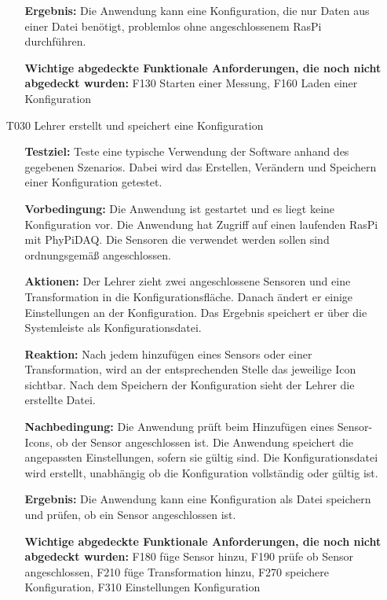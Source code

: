 \documentclass[parskip=full]{scrartcl}
\begin{document}
\begin{itemize}
\begin{itemize}
\item []\textbf{Ergebnis:} Die Anwendung kann eine Konfiguration, die nur Daten aus einer Datei benötigt, problemlos ohne angeschlossenem \gls{RasPi} durchführen. 
\item []\textbf{Wichtige abgedeckte Funktionale Anforderungen, die noch nicht abgedeckt wurden:} F130 Starten einer Messung, F160 Laden einer Konfiguration

\end{itemize}



\item[T030] Lehrer erstellt und speichert eine Konfiguration
\begin{itemize}

\item []\textbf{Testziel:} Teste eine typische Verwendung der Software anhand des gegebenen Szenarios. Dabei wird das Erstellen, Verändern und Speichern einer Konfiguration getestet.

\item []\textbf{Vorbedingung:} Die Anwendung ist gestartet und es liegt keine Konfiguration vor. Die Anwendung hat Zugriff auf einen laufenden \gls{RasPi} mit \gls{PhyPiDAQ}. Die Sensoren die verwendet werden sollen sind ordnungsgemäß angeschlossen.
\item []\textbf{Aktionen:} Der Lehrer zieht zwei angeschlossene Sensoren und eine Transformation in die Konfigurationsfläche. Danach ändert er einige Einstellungen an der Konfiguration. Das Ergebnis speichert er über die Systemleiste als Konfigurationsdatei.
\item []\textbf{Reaktion:} Nach jedem hinzufügen eines Sensors oder einer Transformation, wird an der entsprechenden Stelle das jeweilige Icon sichtbar. Nach dem Speichern der Konfiguration sieht der Lehrer die erstellte Datei.
\item []\textbf{Nachbedingung:} Die Anwendung prüft beim Hinzufügen eines Sensor-Icons, ob der Sensor angeschlossen ist. Die Anwendung speichert die angepassten Einstellungen, sofern sie gültig sind. Die Konfigurationsdatei wird erstellt, unabhängig ob die Konfiguration vollständig oder gültig ist.

\item []\textbf{Ergebnis:} Die Anwendung kann eine Konfiguration als Datei speichern und prüfen, ob ein Sensor angeschlossen ist.
\item []\textbf{Wichtige abgedeckte Funktionale Anforderungen, die noch nicht abgedeckt wurden:} F180 füge Sensor hinzu, F190 prüfe ob Sensor angeschlossen, F210 füge Transformation hinzu, F270 speichere Konfiguration, F310 Einstellungen Konfiguration 


\end{itemize}
\end{itemize}
\end{document}
